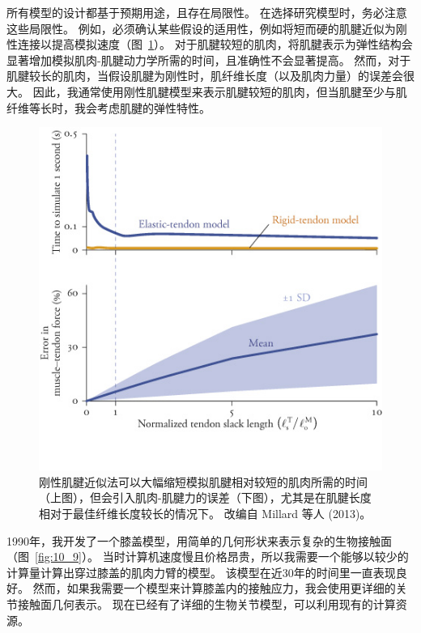 所有模型的设计都基于预期用途，且存在局限性。
在选择研究模型时，务必注意这些局限性。
例如，必须确认某些假设的适用性，例如将短而硬的肌腱近似为刚性连接以提高模拟速度（图~\ref{fig:10_8}）。
对于肌腱较短的肌肉，将肌腱表示为弹性结构会显著增加模拟肌肉-肌腱动力学所需的时间，且准确性不会显著提高。
然而，对于肌腱较长的肌肉，当假设肌腱为刚性时，肌纤维长度（以及肌肉力量）的误差会很大。
因此，我通常使用刚性肌腱模型来表示肌腱较短的肌肉，但当肌腱至少与肌纤维等长时，我会考虑肌腱的弹性特性。


\begin{figure}[!htb]
	\centering
	\includegraphics[width=0.8\linewidth]{chap10/10_8}
	\caption{刚性肌腱近似法可以大幅缩短模拟肌腱相对较短的肌肉所需的时间（上图），但会引入肌肉-肌腱力的误差（下图），尤其是在肌腱长度相对于最佳纤维长度较长的情况下。
		改编自 Millard 等人 (2013)。 \label{fig:10_8}}
\end{figure}


1990年，我开发了一个膝盖模型，用简单的几何形状来表示复杂的生物接触面（图~\ref{fig:10_9}）。
当时计算机速度慢且价格昂贵，所以我需要一个能够以较少的计算量计算出穿过膝盖的肌肉力臂的模型。
该模型在近30年的时间里一直表现良好。
然而，如果我需要一个模型来计算膝盖内的接触应力，我会使用更详细的关节接触面几何表示。
现在已经有了详细的生物关节模型，可以利用现有的计算资源。


